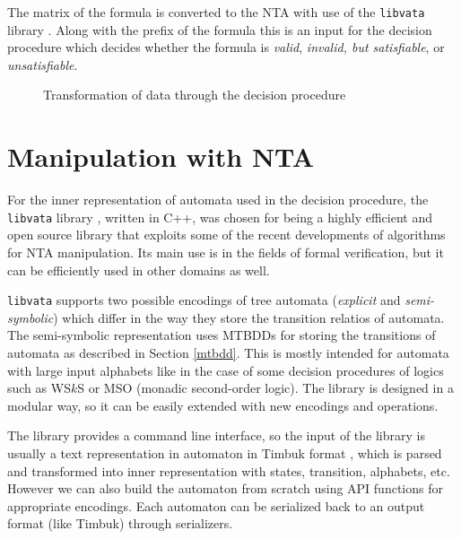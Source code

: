 The matrix of the formula is converted to the NTA
with use of the \texttt{libvata} library
\cite{vata-tool}.
Along with the prefix of the formula this is an input for the decision procedure
which decides whether the formula is \emph{valid}, \emph{invalid, but
satisfiable}, or \emph{unsatisfiable}.

\begin{figure}[hb]
\begin{center}
 \caption{Transformation of data through the decision procedure}\label{flow}
 \end{center}
\end{figure}

\section{Manipulation with NTA}

For the inner representation of automata used in the decision procedure, the
\texttt{libvata} library \cite{vata-tool}, written in C++, was chosen for being
a highly efficient and open source library that exploits some of the recent
developments of algorithms for NTA manipulation. Its main use is in the fields
of formal verification, but it can be efficiently used in other domains as well.

\texttt{libvata} supports two possible encodings of tree automata
(\emph{explicit} and \emph{semi-symbolic}) which differ in the way they store
the transition relatios of automata. The semi-symbolic representation uses
MTBDDs for storing the transitions of automata as described in Section
\ref{mtbdd}. This is mostly intended for automata with large input alphabets
like in the case of some decision procedures of logics such as WS$k$S or MSO
\cite{mso} (monadic second-order logic). The library is designed in a modular
way, so it can be easily extended with new encodings and operations.

The library provides a command line interface, so the input of the library is
usually a text representation in automaton in Timbuk format \cite{timbuk}, which
is parsed and transformed into inner representation with states, transition,
alphabets, etc. However we can also build the automaton from scratch using API
functions for appropriate encodings. Each automaton can be serialized back to an
output format (like Timbuk) through serializers.

